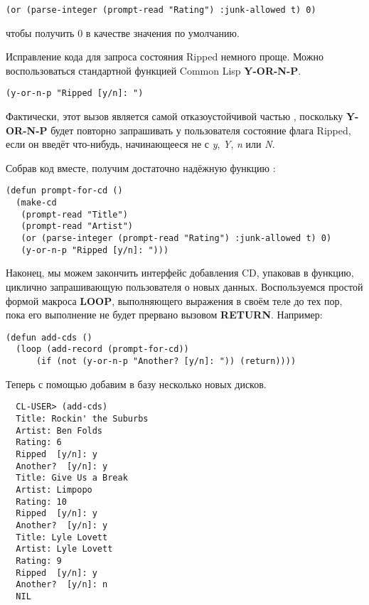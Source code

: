 \begin{lstlisting}
(or (parse-integer (prompt-read "Rating") :junk-allowed t) 0)
\end{lstlisting}

чтобы получить 0 в качестве значения по умолчанию.

Исправление кода для запроса состояния Ripped немного проще. Можно воспользоваться
стандартной функцией Common Lisp \textbf{Y-OR-N-P}.

\begin{lstlisting}
(y-or-n-p "Ripped [y/n]: ")
\end{lstlisting}

Фактически, этот вызов является самой отказоустойчивой частью ,
поскольку \textbf{Y-OR-N-P} будет повторно запрашивать у пользователя состояние флага
Ripped, если он введёт что-нибудь, начинающееся не с \textit{y}, \textit{Y}, \textit{n}
или \textit{N}.

Собрав код вместе, получим достаточно надёжную функцию :

\begin{lstlisting}
(defun prompt-for-cd ()
  (make-cd
   (prompt-read "Title")
   (prompt-read "Artist")
   (or (parse-integer (prompt-read "Rating") :junk-allowed t) 0)
   (y-or-n-p "Ripped [y/n]: ")))
\end{lstlisting}

Наконец, мы можем закончить интерфейс добавления CD, упаковав  в
функцию, циклично запрашивающую пользователя о новых данных. Воспользуемся простой формой
макроса \textbf{LOOP}, выполняющего выражения в своём теле до тех пор, пока его выполнение
не будет прервано вызовом \textbf{RETURN}. Например:

\begin{lstlisting}
(defun add-cds ()
  (loop (add-record (prompt-for-cd))
      (if (not (y-or-n-p "Another? [y/n]: ")) (return))))
\end{lstlisting}

Теперь с помощью  добавим в базу несколько новых дисков.

\begin{verbatim}
  CL-USER> (add-cds)
  Title: Rockin' the Suburbs
  Artist: Ben Folds
  Rating: 6
  Ripped  [y/n]: y
  Another?  [y/n]: y
  Title: Give Us a Break
  Artist: Limpopo
  Rating: 10
  Ripped  [y/n]: y
  Another?  [y/n]: y
  Title: Lyle Lovett
  Artist: Lyle Lovett
  Rating: 9
  Ripped  [y/n]: y
  Another?  [y/n]: n
  NIL
\end{verbatim}

